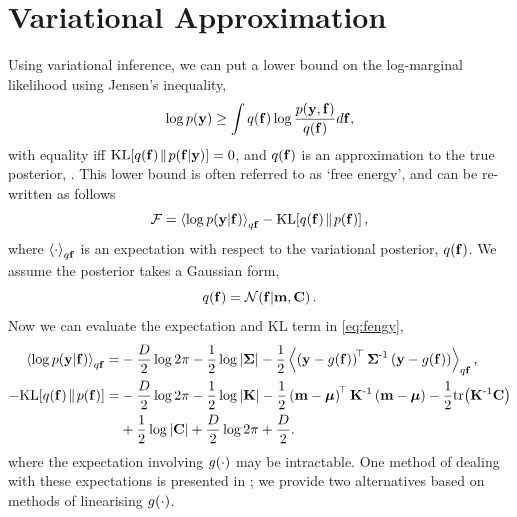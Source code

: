 \documentclass{article} %
\begin{document}
\section{Variational Approximation}

Using variational inference, we can put a lower bound on the log-marginal
likelihood using Jensen's inequality, 
\begin{equation}
    \log p\!\left({\mathbf{y}}\right) \geq \int q\!\left({\mathbf{f}}\right) \log 
        \frac{p\!\left({\mathbf{y}, \mathbf{f}}\right)}{q\!\left({\mathbf{f}}\right)} d\mathbf{f},
\end{equation}
with equality iff $\text{KL}\!\left[{{q\!\left({\mathbf{f}}\right)}\!\parallel\!{p\!\left({\mathbf{f}}\middle\vert{\ensuremath{\mathbf{y}}}\right)}}\right] = 0$, and
$q\!\left({\mathbf{f}}\right)$ is an approximation to the true posterior,
\probC{\lstate}{\obs}. This lower bound is often referred to as `free energy',
and can be re-written as follows
\begin{equation}
    \mathcal{F} = \left\langle{\log \ensuremath{p\!\left({\mathbf{y}}\middle\vert{\ensuremath{\mathbf{f}}}\right)}}\right\rangle_{q\mathbf{f}}
        - \text{KL}\!\left[{{q\!\left({\mathbf{f}}\right)}\!\parallel\!{p\!\left({\mathbf{f}}\right)}}\right],
    \label{eq:fengy}
\end{equation}
where $\left\langle{\cdot}\right\rangle_{q\mathbf{f}}$ is an expectation with respect to the
variational posterior, $q\!\left({\mathbf{f}}\right)$. We assume the posterior takes a
Gaussian form,
\begin{equation}
    q\!\left({\mathbf{f}}\right) = \mathcal{N}\!\left({\mathbf{f}}\middle\vert{\ensuremath{\mathbf{m}}, \ensuremath{\mathbf{C}}}\right). \label{eq:varpost}
\end{equation}
Now we can evaluate the expectation and KL term in \eqref{eq:fengy},
\begin{align}
    \expec{q\lstate}{\log \probC{\obs}{\lstate}}
        =& - \frac{D}{2}\log{2\pi} - \frac{1}{2} \log\deter{\lcov} 
        - \frac{1}{2} 
            \expec{q\lstate}{\brac{\obs - \nonlin{\lstate}}\transpose\lcov\inv
            \brac{\obs - \nonlin{\lstate}}},
            \label{eq:qlike} \\
     - \KL{\qrob{\lstate}}{\prob{\lstate}}
        =& - \frac{D}{2}\log{2\pi} - \frac{1}{2}\log\deter{\prcov}
            - \frac{1}{2} \brac{\pomean - \prmean}\transpose\prcov\inv
            \brac{\pomean - \prmean}
            - \frac{1}{2} \trace{\prcov\inv\pocov} \nonumber \\
        &+ \frac{1}{2} \log\deter{\pocov} 
            + \frac{D}{2}\log{2\pi} + \frac{D}{2} \label{eq:qkl}.
\end{align}
where the expectation involving $g\!\left({{\cdot}}\right)$ may be intractable. One method
of dealing with these expectations is presented in \cite{Opper2009}; we provide
two alternatives based on methods of linearising $g\!\left({{\cdot}}\right)$.
\end{document}
